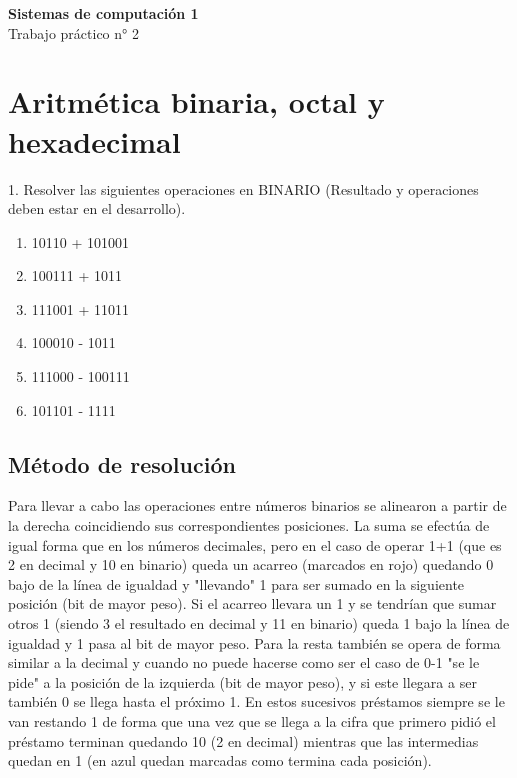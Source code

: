 \documentclass[a4paper,12pt]{article}
\begin{document}
	
	\begin{center}
		
		\LARGE \textbf{Sistemas de computación 1} \\[0.5cm]
		\LARGE Trabajo práctico n° 2 \\
	\end{center}
	
	\section*{Aritmética binaria, octal y hexadecimal}
	1. Resolver las siguientes operaciones en BINARIO (Resultado y operaciones deben estar en el desarrollo).
	\renewcommand{\theenumi}{\alph{enumi}}
	\begin{enumerate}
		\item  10110 + 101001
		\item  100111 + 1011
		\item  111001 + 11011
		\item  100010 - 1011
		\item  111000 - 100111
		\item  101101 - 1111 
	\end{enumerate}

	\subsection*{Método de resolución}
	Para llevar a cabo las operaciones entre números binarios se alinearon a partir de la derecha coincidiendo sus correspondientes posiciones. La suma se efectúa de igual forma que en los números decimales, pero en el caso de operar 1+1 (que es 2 en decimal y 10 en binario) queda un acarreo (marcados en rojo) quedando 0 bajo de la línea de igualdad y "llevando" 1 para ser sumado en la siguiente posición (bit de mayor peso). Si el acarreo llevara un 1 y se tendrían que sumar otros 1 (siendo 3 el resultado en decimal y 11 en binario) queda 1 bajo la línea de igualdad y 1 pasa al bit de mayor peso.
	Para la resta también se opera de forma similar a la decimal y cuando no puede hacerse como ser el caso de 0-1 "se le pide" a la posición de la izquierda (bit de mayor peso), y si este llegara a ser también 0 se llega hasta el próximo 1. En estos sucesivos préstamos siempre se le van restando 1 de forma que una vez que se llega a la cifra que primero pidió el préstamo terminan quedando 10 (2 en decimal) mientras que las intermedias quedan en 1 (en azul quedan marcadas como termina cada posición).\\
		
\end{document}
